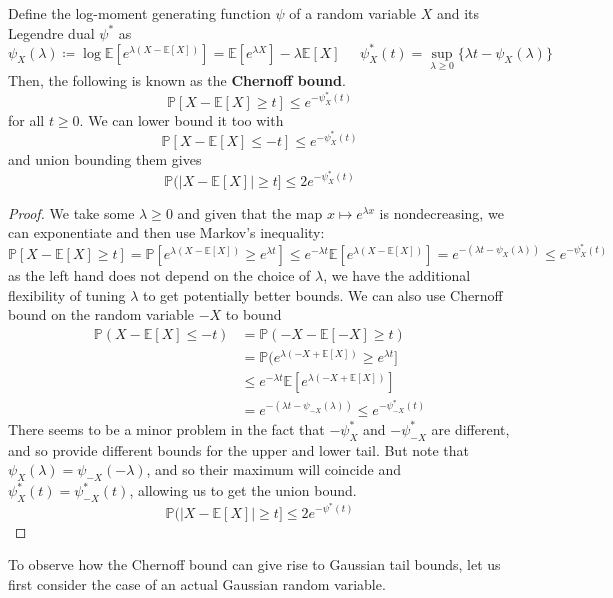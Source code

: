   \begin{lemma}
  Define the log-moment generating function $\psi$ of a random variable $X$ and its Legendre dual $\psi^*$ as 
  \[\psi_X (\lambda) \coloneqq \log \mathbb{E}[ e^{\lambda (X - \mathbb{E}[X])} ] = \mathbb{E}[ e^{\lambda X} ] - \lambda \mathbb{E}[X] \;\;\;\;\; \psi_X^* (t) = \sup_{\lambda \geq 0} \{ \lambda t - \psi_X(\lambda)\}\]
  Then, the following is known as the \textbf{Chernoff bound}. 
  \[\mathbb{P}[X - \mathbb{E}[X] \geq t] \leq e^{-\psi_X^* (t)}\]
  for all $t \geq 0$. We can lower bound it too with 
  \[\mathbb{P}[X - \mathbb{E}[X] \leq -t] \leq e^{-\psi_X^* (t)}\]
  and union bounding them gives 
  \[\mathbb{P}(|X - \mathbb{E}[X] | \geq t ] \leq 2e^{- \psi_X^* (t)}\]
  \end{lemma}
  \begin{proof}
  We take some $\lambda \geq 0$ and given that the map $x \mapsto e^{\lambda x}$ is nondecreasing, we can exponentiate and then use Markov's inequality: 
  \[\mathbb{P}[X - \mathbb{E}[X] \geq t ] = \mathbb{P}[ e^{\lambda(X - \mathbb{E}[X])} \geq e^{\lambda t}] \leq e^{-\lambda t} \mathbb{E}[e^{\lambda (X - \mathbb{E}[X])}] = e^{- (\lambda t - \psi_X (\lambda))} \leq e^{-\psi_X^* (t)}\]
  as the left hand does not depend on the choice of $\lambda$, we have the additional flexibility of tuning $\lambda$ to get potentially better bounds. We can also use Chernoff bound on the random variable $-X$ to bound \begin{align*}
      \mathbb{P}(X - \mathbb{E}[X] \leq -t) & = \mathbb{P}(-X - \mathbb{E}[-X] \geq t) \\
      & = \mathbb{P}(e^{\lambda(-X + \mathbb{E}[X])} \geq e^{\lambda t} ] \\
      & \leq e^{-\lambda t} \mathbb{E}[ e^{\lambda (-X + \mathbb{E}[X])}] \\
      & = e^{-(\lambda t - \psi_{-X}(\lambda))} \leq e^{-\psi_{-X}^* (t)} 
  \end{align*}
  There seems to be a minor problem in the fact that $-\psi^*_X$ and $-\psi^*_{-X}$ are different, and so provide different bounds for the upper and lower tail. But note that $\psi_X (\lambda) = \psi_{-X}(-\lambda)$, and so their maximum will coincide and $\psi_X^* (t) = \psi_{-X}^* (t)$, allowing us to get the union bound. 
  \[\mathbb{P}(|X - \mathbb{E}[X] | \geq t ] \leq 2e^{- \psi^* (t)}\]
  \end{proof}

  To observe how the Chernoff bound can give rise to Gaussian tail bounds, let us first consider the case of an actual Gaussian random variable. 

